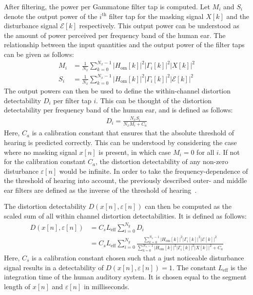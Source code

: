 After filtering, the power per Gammatone filter tap is computed.
Let $M_i$ and $S_i$ denote the output power of the $i^\text{th}$ filter tap for the masking signal $X[k]$ and 
the disturbance signal $\mathcal{E}[k]$ respectively.
This output power can be understood as the amount of power perceived per frequency band of the human ear. 
The relationship between the input quantities and the output power of the filter taps can be given as follows:
\begin{align}
    M_i &= \frac{1}{N_x}\sum_{k=0}^{N_x-1}\left|H_\text{om}[k]\right|^2\left|\Gamma_i[k]\right|^2\left|X[k]\right|^2 \\
    S_i &= \frac{1}{N_x}\sum_{k=0}^{N_x-1}\left|H_\text{om}[k]\right|^2\left|\Gamma_i[k]\right|^2\left|\mathcal{E}[k]\right|^2 
\end{align}
The output powers can then be used to define the within-channel distortion detectability $D_i$ per filter tap $i$.
This can be thought of the distortion detectability per frequency band of the human ear, and is defined as follows:
\begin{align}
    D_i = \frac{N_xS_i}{N_xM_i + C_a}
\end{align}
Here, $C_a$ is a calibration constant that ensures that the absolute threshold of hearing is predicted correctly.
This can be understood by considering the case where no masking signal $x[n]$ is present, 
in which case $M_i = 0$ for all $i$.
If not for the calibration constant $C_a$, the distortion detectability of any non-zero disturbance
$\varepsilon[n]$ would be infinite.
In order to take the frequency-dependence of the threshold of hearing into account, the previously described outer- and middle ear filters are defined as the
inverse of the threshold of hearing~\cite{van2005perceptual}.

The distortion detectability $D(x[n],\varepsilon[n])$ can then be computed as the scaled sum of all 
within channel distortion detectabilities.
It is defined as follows:
\begin{align}
    D(x[n],\varepsilon[n]) &= C_s L_\text{eff}\sum_{i=0}^{N_g} D_i \\
                        &= C_s L_\text{eff}\sum_{i=0}^{N_g} 
                        \frac{\sum_{k=0}^{N_x-1}\left|H_\text{om}[k]\right|^2\left|
                            \Gamma_i[k]\right|^2\left|\mathcal{E}[k]\right|^2}
                        {\sum_{k=0}^{N_x-1}\left|H_\text{om}[k]\right|^2\left|
                            \Gamma_i[k]\right|^2\left|X[k]\right|^2 + C_a}
    \label{eq:perceptual:implementation:computation:detectability}
\end{align}
Here, $C_s$ is a calibration constant chosen such that a just noticeable disturbance signal results in a 
detectability of $D(x[n],\varepsilon[n]) = 1$. 
The constant $L_\text{eff}$ is the integration time of the human auditory system.
It is chosen equal to the segment length of $x[n]$ and $\varepsilon[n]$ in milliseconds.  


